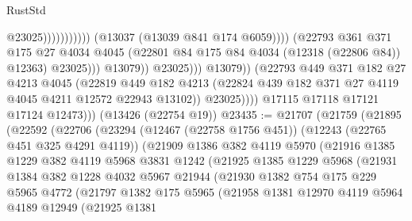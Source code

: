 \begin{lexlean}{RustStd}
\begin{coremodule}
                                                            @23025)))))))))))
                                      (@13037 (@13039 @841 @174 @6059))))
                                  (@22793
                                    @361
                                    @371
                                    @175
                                    @27
                                    @4034
                                    @4045
                                    (@22801 @84 @175 @84 @4034 (@12318 (@22806 @84)) @12363)
                                    @23025)))
                              @13079))
                          @23025)))
                    @13079))
                (@22793
                  @449
                  @371
                  @182
                  @27
                  @4213
                  @4045
                  (@22819
                    @449
                    @182
                    @4213
                    (@22824 @439 @182 @371 @27 @4119 @4045 @4211 @12572 @22943 @13102))
                  @23025))))
          @17115
          @17118
          @17121
          @17124
          @12473)))
    (@13426 (@22754 @19))
@23435 := @21707
    (@21759
      (@21895
        (@22592
          (@22706
            (@23294
              (@12467 (@22758 @1756 @451))
              (@12243 (@22765 @451 @325 @4291 @4119))
              (@21909
                @1386
                @382
                @4119
                @5970
                (@21916
                  @1385
                  @1229
                  @382
                  @4119
                  @5968
                  @3831
                  @1242
                  (@21925
                    @1385
                    @1229
                    @5968
                    (@21931
                      @1384
                      @382
                      @1228
                      @4032
                      @5967
                      @21944
                      (@21930
                        @1382
                        @754
                        @175
                        @229
                        @5965
                        @4772
                        (@21797
                          @1382
                          @175
                          @5965
                          (@21958
                            @1381
                            @12970
                            @4119
                            @5964
                            @4189
                            @12949
                            (@21925
                              @1381

\end{coremodule}
\end{lexlean}
